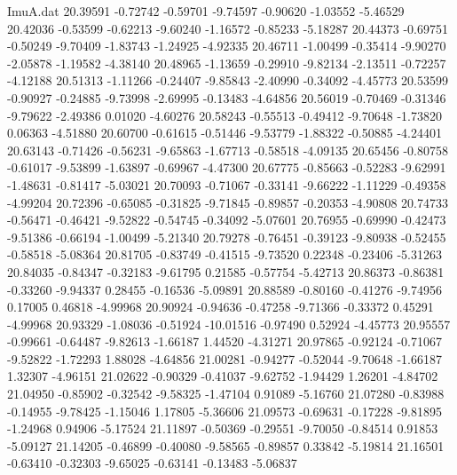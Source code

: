 \begin{filecontents}{ImuA.dat}
  20.39591   -0.72742   -0.59701   -9.74597   -0.90620   -1.03552   -5.46529
  20.42036   -0.53599   -0.62213   -9.60240   -1.16572   -0.85233   -5.18287
  20.44373   -0.69751   -0.50249   -9.70409   -1.83743   -1.24925   -4.92335
  20.46711   -1.00499   -0.35414   -9.90270   -2.05878   -1.19582   -4.38140
  20.48965   -1.13659   -0.29910   -9.82134   -2.13511   -0.72257   -4.12188
  20.51313   -1.11266   -0.24407   -9.85843   -2.40990   -0.34092   -4.45773
  20.53599   -0.90927   -0.24885   -9.73998   -2.69995   -0.13483   -4.64856
  20.56019   -0.70469   -0.31346   -9.79622   -2.49386    0.01020   -4.60276
  20.58243   -0.55513   -0.49412   -9.70648   -1.73820    0.06363   -4.51880
  20.60700   -0.61615   -0.51446   -9.53779   -1.88322   -0.50885   -4.24401
  20.63143   -0.71426   -0.56231   -9.65863   -1.67713   -0.58518   -4.09135
  20.65456   -0.80758   -0.61017   -9.53899   -1.63897   -0.69967   -4.47300
  20.67775   -0.85663   -0.52283   -9.62991   -1.48631   -0.81417   -5.03021
  20.70093   -0.71067   -0.33141   -9.66222   -1.11229   -0.49358   -4.99204
  20.72396   -0.65085   -0.31825   -9.71845   -0.89857   -0.20353   -4.90808
  20.74733   -0.56471   -0.46421   -9.52822   -0.54745   -0.34092   -5.07601
  20.76955   -0.69990   -0.42473   -9.51386   -0.66194   -1.00499   -5.21340
  20.79278   -0.76451   -0.39123   -9.80938   -0.52455   -0.58518   -5.08364
  20.81705   -0.83749   -0.41515   -9.73520    0.22348   -0.23406   -5.31263
  20.84035   -0.84347   -0.32183   -9.61795    0.21585   -0.57754   -5.42713
  20.86373   -0.86381   -0.33260   -9.94337    0.28455   -0.16536   -5.09891
  20.88589   -0.80160   -0.41276   -9.74956    0.17005    0.46818   -4.99968
  20.90924   -0.94636   -0.47258   -9.71366   -0.33372    0.45291   -4.99968
  20.93329   -1.08036   -0.51924  -10.01516   -0.97490    0.52924   -4.45773
  20.95557   -0.99661   -0.64487   -9.82613   -1.66187    1.44520   -4.31271
  20.97865   -0.92124   -0.71067   -9.52822   -1.72293    1.88028   -4.64856
  21.00281   -0.94277   -0.52044   -9.70648   -1.66187    1.32307   -4.96151
  21.02622   -0.90329   -0.41037   -9.62752   -1.94429    1.26201   -4.84702
  21.04950   -0.85902   -0.32542   -9.58325   -1.47104    0.91089   -5.16760
  21.07280   -0.83988   -0.14955   -9.78425   -1.15046    1.17805   -5.36606
  21.09573   -0.69631   -0.17228   -9.81895   -1.24968    0.94906   -5.17524
  21.11897   -0.50369   -0.29551   -9.70050   -0.84514    0.91853   -5.09127
  21.14205   -0.46899   -0.40080   -9.58565   -0.89857    0.33842   -5.19814
  21.16501   -0.63410   -0.32303   -9.65025   -0.63141   -0.13483   -5.06837

\end{filecontents}
